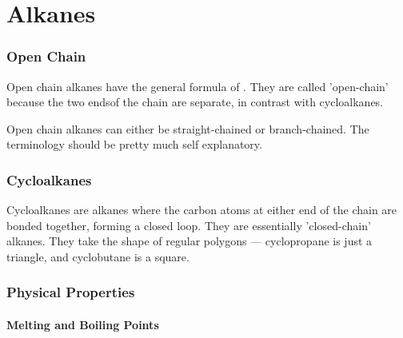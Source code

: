 

\pagebreak
\part{Alkanes}
	\section{Open Chain}

		Open chain alkanes have the general formula of . They are called 'open-chain' because
		the two endsof the chain are separate, in contrast with cycloalkanes.

		Open chain alkanes can either be straight-chained or branch-chained. The terminology should be pretty much
		self explanatory.





	\section{Cycloalkanes}

		Cycloalkanes are alkanes where the carbon atoms at either end of the chain are bonded together, forming a closed loop.
		They are essentially 'closed-chain' alkanes. They take the shape of regular polygons –– cyclopropane is just a triangle,
		and cyclobutane is a square.




	\pagebreak
	\section{Physical Properties}
		\subsection{Melting and Boiling Points}

